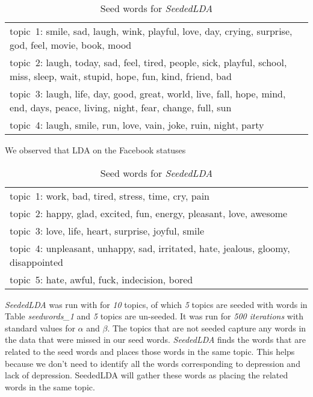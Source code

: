 \begin{table*} [ht!]
	\begin{tabular}{ l }
\hline
{topic~1: smile, sad, laugh, wink, playful, love, day, crying, surprise, god, feel, movie, book, mood}\\
{topic~2: laugh, today, sad, feel, tired, people, sick, playful, school, miss, sleep, wait, stupid, hope, fun, kind, friend, bad}\\
{topic~3: laugh, life, day, good, great, world, live, fall, hope, mind, end, days, peace, living, night, fear, change, full, sun}\\
{topic~4: laugh, smile, run, love, vain, joke, ruin, night, party}\\
\hline
    \end{tabular}
      \caption{\noindent Seed words for \textit{SeededLDA}}
        \label{table:ldawords_1}
\end{table*}

We observed that LDA on the Facebook statuses
\begin{table*} [ht!]
	\begin{tabular}{ l }
	\hline
{topic~1: work, bad, tired, stress, time, cry, pain}\\
{topic~2: happy, glad, excited, fun, energy, pleasant, love, awesome}\\
{topic~3: love, life, heart, surprise, joyful, smile}\\
{topic~4: unpleasant, unhappy, sad, irritated, hate, jealous, gloomy, disappointed }\\
{topic~5: hate, awful, fuck, indecision, bored}\\
\hline
    \end{tabular}
      \caption{\noindent Seed words for \textit{SeededLDA}}
        \label{table:seedwords_1}
\end{table*}

\textit{SeededLDA} was run with for \textit{10} topics, of which \textit{5} topics are seeded with words in Table \textit{seedwords\_1} and \textit{5} topics are un-seeded. It was run for \textit{500 iterations} with standard values for $\alpha$ and $\beta$. The topics that are not seeded capture any words in the data that were missed in our seed words. \textit{SeededLDA} finds the words that are related to the seed words and places those words in the same topic. This helps because we don't need to identify all the words corresponding to depression and lack of depression. SeededLDA will gather these words as placing the related words in the same topic.


